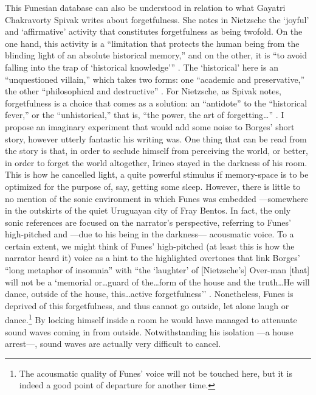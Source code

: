 This Funesian database can also be understood in relation to what Gayatri Chakravorty Spivak \parencite{Der76:Of} writes about forgetfulness. She notes in Nietzsche the `joyful' and `affirmative' activity that constitutes forgetfulness as being twofold. On the one hand, this activity is a ``limitation that protects the human being from the blinding light of an absolute historical memory,'' and on the other, it is ``to avoid falling into the trap of `historical knowledge''' \parencite[xxxi]{Der76:Of}. The `historical' here is an ``unquestioned villain,'' which takes two forms: one ``academic and preservative,'' the other ``philosophical and destructive'' \parencite[xxxi]{Der76:Of}. For Nietzsche, as Spivak notes, forgetfulness is a choice that comes as a solution: an ``antidote'' to the ``historical fever,'' or the ``unhistorical,'' that is, ``the power, the art of forgetting\dots'' \parencite[xxxi]{Der76:Of}. I propose an imaginary experiment that would add some noise to Borges' short story, however utterly fantastic his writing was. One thing that can be read from the story is that, in order to seclude himself from perceiving the world, or better, in order to forget the world altogether, Irineo stayed in the darkness of his room. This is how he cancelled light, a quite powerful stimulus if memory-space is to be optimized for the purpose of, say, getting some sleep. However, there is little to no mention of the sonic environment in which Funes was embedded ---somewhere in the outskirts of the quiet Uruguayan city of Fray Bentos. In fact, the only sonic references are focused on the narrator's perspective, referring to Funes' high-pitched and ---due to his being in the darkness--- acousmatic voice. To a certain extent, we might think of Funes' high-pitched (at least this is how the narrator heard it) voice as a hint to the highlighted overtones that link Borges' ``long metaphor of insomnia'' with ``the `laughter' of [Nietzsche's] Over-man [that] will not be a `memorial or\dots guard of the\dots form of the house and the truth\dots He will dance, outside of the house, this\dots active forgetfulness'' \parencite[xxxii]{Der76:Of}. Nonetheless, Funes is deprived of this forgetfulness, and thus cannot go outside, let alone laugh or dance.\footnote{The acousmatic quality of Funes' voice will not be touched here, but it is indeed a good point of departure for another time.} By locking himself inside a room he would have managed to attenuate sound waves coming in from outside. Notwithstanding his isolation ---a house arrest---, sound waves are actually very difficult to cancel.

